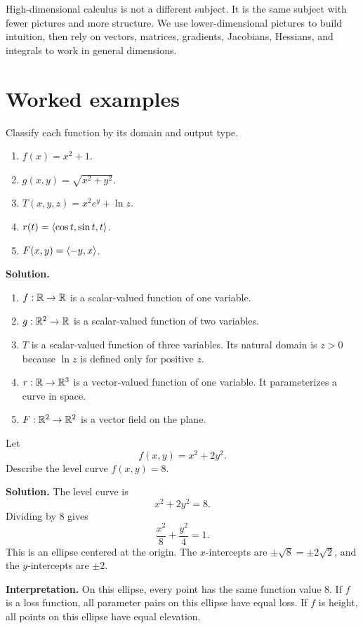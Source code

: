 \begin{warningbox}
High-dimensional calculus is not a different subject. It is the same subject with fewer pictures and more structure. We use lower-dimensional pictures to build intuition, then rely on vectors, matrices, gradients, Jacobians, Hessians, and integrals to work in general dimensions.
\end{warningbox}

\section{Worked examples}

\begin{examplebox}[title={1. Classifying functions by domain and output}]
Classify each function by its domain and output type.
\begin{enumerate}
  \item $f(x)=x^2+1$.
  \item $g(x,y)=\sqrt{x^2+y^2}$.
  \item $T(x,y,z)=x^2e^y+\ln z$.
  \item $r(t)=\left\langle \cos t,\sin t,t\right\rangle$.
  \item $F(x,y)=\left\langle -y,x\right\rangle$.
\end{enumerate}

\textbf{Solution.}
\begin{enumerate}
  \item $f:\mathbb{R}\to\mathbb{R}$ is a scalar-valued function of one variable.
  \item $g:\mathbb{R}^2\to\mathbb{R}$ is a scalar-valued function of two variables.
  \item $T$ is a scalar-valued function of three variables. Its natural domain is $z>0$ because $\ln z$ is defined only for positive $z$.
  \item $r:\mathbb{R}\to\mathbb{R}^3$ is a vector-valued function of one variable. It parameterizes a curve in space.
  \item $F:\mathbb{R}^2\to\mathbb{R}^2$ is a vector field on the plane.
\end{enumerate}
\end{examplebox}

\begin{examplebox}[title={2. Reading a level curve}]
Let
\[
  f(x,y)=x^2+2y^2.
\]
Describe the level curve $f(x,y)=8$.

\textbf{Solution.}
The level curve is
\[
  x^2+2y^2=8.
\]
Dividing by $8$ gives
\[
  \frac{x^2}{8}+\frac{y^2}{4}=1.
\]
This is an ellipse centered at the origin. The $x$-intercepts are $\pm\sqrt8=\pm2\sqrt2$, and the $y$-intercepts are $\pm2$.

\textbf{Interpretation.} On this ellipse, every point has the same function value $8$. If $f$ is a loss function, all parameter pairs on this ellipse have equal loss. If $f$ is height, all points on this ellipse have equal elevation.
\end{examplebox}

